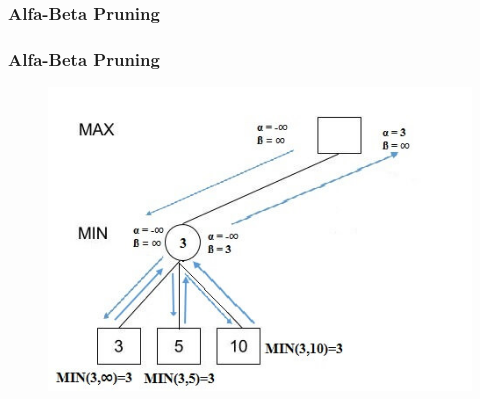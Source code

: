 \documentclass[polish,envcountsect,10pt]{beamer}
\begin{document}
            \subsubsection{Alfa-Beta Pruning}
            \begin{frame}
                \frametitle{Alfa-Beta Pruning}
                \begin{figure}[H]
                    \centering
                    \includegraphics[width=\textwidth]{images/ab}
                \end{figure}
            \end{frame}
\end{document}
